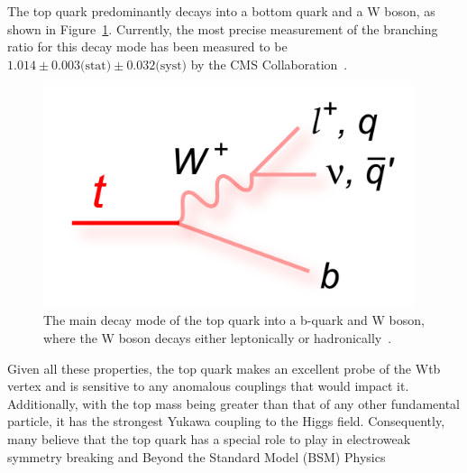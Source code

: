 The top quark predominantly decays into a bottom quark and a W boson, as shown in Figure~\ref{fig:topDecay}.
Currently, the most precise measurement of the branching ratio for this decay mode has been measured to be $1.014 \pm 0.003 \textrm{(stat)} \pm 0.032 \textrm{(syst)}$ by the CMS Collaboration~\cite{Khachatryan:2014nda}.

\begin{figure}[htbp]
\begin{center}
\includegraphics[width=0.97\textwidth]{figs/top-physics/topDecay.png}
\caption{The main decay mode of the top quark into a b-quark and W boson, where the W boson decays either leptonically or hadronically~\cite{topDiagrams}.}
\label{fig:topDecay}
\end{center}
\end{figure}

Given all these properties, the top quark makes an excellent probe of the Wtb vertex and is sensitive to any anomalous couplings that would impact it.
Additionally, with the top mass being greater than that of any other fundamental particle, it has the strongest Yukawa coupling to the Higgs field.
Consequently, many believe that the top quark has a special role to play in electroweak symmetry breaking and Beyond the Standard Model (BSM) Physics~\cite{Giammanco:2017xyn}
 

